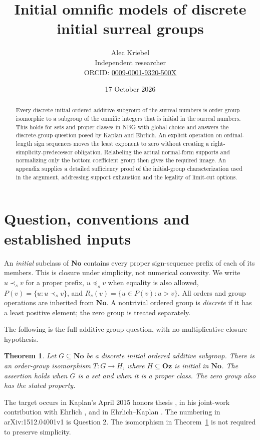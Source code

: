 \documentclass[11pt]{article}
\title{Initial omnific models of discrete initial surreal groups}
\author{Alec Kriebel\\\small Independent researcher\\\small ORCID: \href{https://orcid.org/0009-0001-9320-500X}{0009-0001-9320-500X}}
\date{17 October 2026}
\newcommand{\No}{\mathbf{No}}
\newcommand{\Oz}{\mathbf{Oz}}
\newtheorem{theorem}{Theorem}
\begin{document}
\maketitle
\begin{abstract}
Every discrete initial ordered additive subgroup of the surreal numbers is
order-group-isomorphic to a subgroup of the omnific integers that is initial
in the surreal numbers. This holds for sets and proper classes in NBG with
global choice and answers the discrete-group question posed by Kaplan and
Ehrlich. An explicit operation on ordinal-length sign sequences moves the
least exponent to zero without creating a right-simplicity-predecessor
obligation. Relabeling the actual normal-form supports and normalizing
only the bottom coefficient group then gives the required image.
An appendix supplies a detailed sufficiency proof of the initial-group
characterization used in the argument, addressing support exhaustion and
the legality of limit-cut options.
\end{abstract}

\section{Question, conventions and established inputs}
An \emph{initial} subclass of $\No$ contains every proper sign-sequence
prefix of each of its members. This is closure under simplicity, not
numerical convexity. We write $u\prec_s v$ for a proper prefix,
$u\preceq_s v$ when equality is also allowed,
$P(v)=\{u:u\prec_s v\}$, and
$R_s(v)=\{u\in P(v):u>v\}$. All orders and group operations are inherited
from $\No$. A nontrivial ordered group is \emph{discrete} if it has a least
positive element; the zero group is treated separately.

The following is the full additive-group question, with no multiplicative
closure hypothesis.
\begin{theorem}\label{main}
Let $G\subseteq\No$ be a discrete initial ordered additive subgroup.
There is an order-group isomorphism $T:G\longrightarrow H$, where
$H\subseteq\Oz$ is initial in $\No$. The assertion holds when $G$ is a set
and when it is a proper class. The zero group also has the stated property.
\end{theorem}
The target occurs in Kaplan's April 2015 honors thesis
\cite[\S7.1, Question 1, p.~47]{thesis}, in his joint-work contribution
with Ehrlich \cite[Question 1, p.~3356]{owr}, and in Ehrlich--Kaplan
\cite[Question 9.1 in the author version]{ek}.
The numbering in arXiv:1512.04001v1 is Question 2.
The isomorphism in Theorem~\ref{main} is not required to preserve simplicity.
\end{document}
